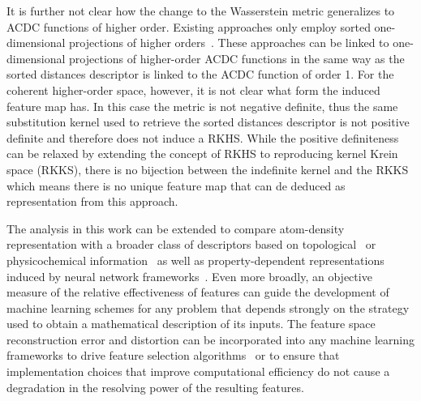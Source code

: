 It is further not clear how the change to the Wasserstein metric generalizes to ACDC functions of higher order.
Existing approaches only employ sorted one-dimensional projections of higher orders~\cite{huang2016communication}.
These approaches can be linked to one-dimensional projections of higher-order ACDC functions in the same way as the sorted distances descriptor is linked to the ACDC function of order 1.
For the coherent higher-order space, however, it is not clear what form the induced feature map has.
In this case the metric is not negative definite, thus the same substitution kernel used to retrieve the sorted distances descriptor is not positive definite and therefore does not induce a RKHS.
While the positive definiteness can be relaxed by extending the concept of RKHS to reproducing kernel Krein space (RKKS), there is no bijection between the indefinite kernel and the RKKS~\cite{pmlr-v80-oglic18a} which means there is no unique feature map that can de deduced as representation from this approach.

The analysis in this work can be extended to compare atom-density representation with a broader class of descriptors based on topological~\cite{isayev2017universal, sutton2019crowd, liu2019n} or physicochemical information~\cite{pilania2013accelerating, ward2016general, ouya+18prm} as well as property-dependent representations induced by neural network frameworks~\cite{schu+18jcp, cohen2018spherical}. 
Even more broadly, an objective measure of the relative effectiveness of features can guide the development of machine learning schemes for any problem that depends strongly on the strategy used to obtain a mathematical description of its inputs. 
The feature space reconstruction error and distortion can be incorporated into any machine learning frameworks to drive feature selection algorithms~\cite{imba+18jcp,ouya+18prm,paleico2021bin} or to ensure that implementation choices that improve computational efficiency do not cause a degradation in the resolving power of the resulting features.


